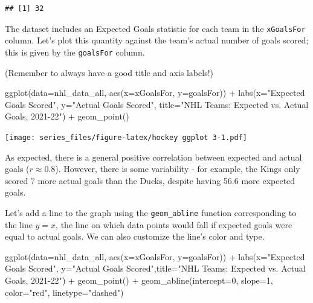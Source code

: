 \documentclass[
]{book}
\newenvironment{Shaded}{\begin{snugshade}}{\end{snugshade}}
\newcommand{\AttributeTok}[1]{\textcolor[rgb]{0.77,0.63,0.00}{#1}}
\newcommand{\DecValTok}[1]{\textcolor[rgb]{0.00,0.00,0.81}{#1}}
\newcommand{\FunctionTok}[1]{\textcolor[rgb]{0.00,0.00,0.00}{#1}}
\newcommand{\NormalTok}[1]{#1}
\newcommand{\SpecialCharTok}[1]{\textcolor[rgb]{0.00,0.00,0.00}{#1}}
\newcommand{\StringTok}[1]{\textcolor[rgb]{0.31,0.60,0.02}{#1}}
\theoremstyle{definition}
\theoremstyle{definition}
\theoremstyle{definition}
\theoremstyle{definition}
\theoremstyle{remark}
\begin{document}
\begin{verbatim}
## [1] 32
\end{verbatim}

The dataset includes an Expected Goals statistic for each team in the \texttt{xGoalsFor} column. Let's plot this quantity against the team's actual number of goals scored; this is given by the \texttt{goalsFor} column.

(Remember to always have a good title and axis labels!)

\begin{Shaded}
\begin{Highlighting}[]
\FunctionTok{ggplot}\NormalTok{(}\AttributeTok{data=}\NormalTok{nhl\_data\_all, }\FunctionTok{aes}\NormalTok{(}\AttributeTok{x=}\NormalTok{xGoalsFor, }\AttributeTok{y=}\NormalTok{goalsFor)) }\SpecialCharTok{+} \FunctionTok{labs}\NormalTok{(}\AttributeTok{x=}\StringTok{"Expected Goals Scored"}\NormalTok{, }\AttributeTok{y=}\StringTok{"Actual Goals Scored"}\NormalTok{, }\AttributeTok{title=}\StringTok{"NHL Teams: Expected vs. Actual Goals, 2021{-}22"}\NormalTok{) }\SpecialCharTok{+} \FunctionTok{geom\_point}\NormalTok{()}
\end{Highlighting}
\end{Shaded}

\texttt{[image: series\_files/figure-latex/hockey ggplot 3-1.pdf]}

As expected, there is a general positive correlation between expected and actual goals (\(r \approx 0.8\)). However, there is some variability - for example, the Kings only scored 7 more actual goals than the Ducks, despite having 56.6 more expected goals.

Let's add a line to the graph using the \texttt{geom\_abline} function corresponding to the line \(y=x\), the line on which data points would fall if expected goals were equal to actual goals. We can also customize the line's color and type.

\begin{Shaded}
\begin{Highlighting}[]
\FunctionTok{ggplot}\NormalTok{(}\AttributeTok{data=}\NormalTok{nhl\_data\_all, }\FunctionTok{aes}\NormalTok{(}\AttributeTok{x=}\NormalTok{xGoalsFor, }\AttributeTok{y=}\NormalTok{goalsFor)) }\SpecialCharTok{+} \FunctionTok{labs}\NormalTok{(}\AttributeTok{x=}\StringTok{"Expected Goals Scored"}\NormalTok{, }\AttributeTok{y=}\StringTok{"Actual Goals Scored"}\NormalTok{,}\AttributeTok{title=}\StringTok{"NHL Teams: Expected vs. Actual Goals, 2021{-}22"}\NormalTok{) }\SpecialCharTok{+} \FunctionTok{geom\_point}\NormalTok{() }\SpecialCharTok{+} \FunctionTok{geom\_abline}\NormalTok{(}\AttributeTok{intercept=}\DecValTok{0}\NormalTok{, }\AttributeTok{slope=}\DecValTok{1}\NormalTok{, }\AttributeTok{color=}\StringTok{"red"}\NormalTok{, }\AttributeTok{linetype=}\StringTok{"dashed"}\NormalTok{)}
\end{Highlighting}
\end{Shaded}
\end{document}
